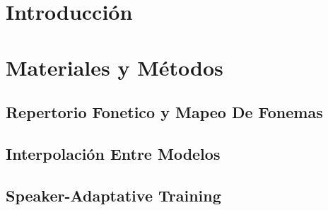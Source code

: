 \documentclass[11pt,a4paper,twoside]{tesis}
\begin{document}

\def\autor{Franco Negri}
\def\tituloTesis{Implementación y evaluación de un sistema de sintesis de habla con acento extranjero variable}
\def\runtitle{Implementacíón y evaluación de un sistema de sintesis de habla}
\def\director{Agustin Gravano}
\def\codirector{Master Yoda}
\def\lugar{Buenos Aires, 2018}


\frontmatter

\pagestyle{empty}
%
\cleardoublepage
\cleardoublepage

\cleardoublepage
\tableofcontents

\mainmatter
\pagestyle{headings}

%
\chapter{Introducción}

\chapter{Materiales y Métodos}


\section{Repertorio Fonetico y Mapeo De Fonemas}


\section{Interpolación Entre Modelos}


\section{Speaker-Adaptative Training}

\end{document}
